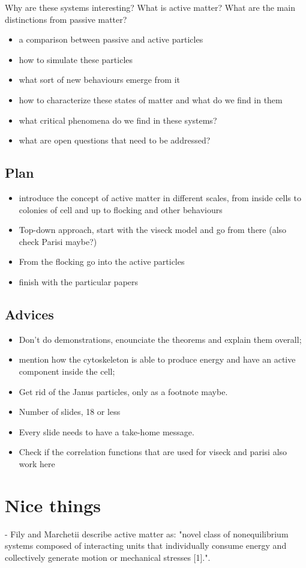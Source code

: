 \documentclass[a4paper]{article}
\begin{document}
Why are these systems interesting? What is active matter? What are the main distinctions from passive matter?

\begin{itemize}
	\item a comparison between passive and active particles
	\item how to simulate these particles
	\item what sort of new behaviours emerge from it
	\item how to characterize these states of matter and what do we find in them
	\item what critical phenomena do we find in these systems?
	\item what are open questions that need to be addressed?
\end{itemize}

\subsection{Plan}

\begin{itemize}
	\item introduce the concept of active matter in different scales, from inside cells to colonies of cell and up to flocking and other behaviours
	\item Top-down approach, start with the viseck model and go from there (also check Parisi maybe?)
	\item From the flocking go into the active particles
	\item finish with the particular papers
\end{itemize}

\subsection{Advices}

\begin{itemize}
	\item Don't do demonstrations, enounciate the theorems and explain them overall;
	\item mention how the cytoskeleton is able to produce energy and have an active component inside the cell;
	\item Get rid of the Janus particles, only as a footnote maybe.
	\item Number of slides, 18 or less
	\item Every slide needs to have a take-home message.
	\item Check if the correlation functions that are used for viseck and parisi also work here\\
	
\end{itemize}

\section*{Nice things}

- Fily and Marchetii describe active matter as: "novel class of nonequilibrium systems composed of interacting units that individually consume energy and collectively generate motion or mechanical stresses [1].".
\end{document}
